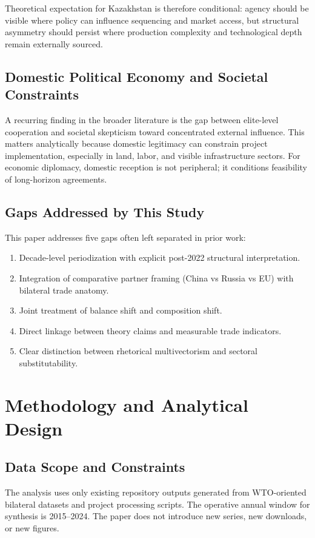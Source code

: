 \documentclass[12pt]{article}
\begin{document}
Theoretical expectation for Kazakhstan is therefore conditional: agency should be visible where policy can influence sequencing and market access, but structural asymmetry should persist where production complexity and technological depth remain externally sourced.

\subsection{Domestic Political Economy and Societal Constraints}
A recurring finding in the broader literature is the gap between elite-level cooperation and societal skepticism toward concentrated external influence. This matters analytically because domestic legitimacy can constrain project implementation, especially in land, labor, and visible infrastructure sectors. For economic diplomacy, domestic reception is not peripheral; it conditions feasibility of long-horizon agreements.

\subsection{Gaps Addressed by This Study}
This paper addresses five gaps often left separated in prior work:
\begin{enumerate}[leftmargin=*]
\item Decade-level periodization with explicit post-2022 structural interpretation.
\item Integration of comparative partner framing (China vs Russia vs EU) with bilateral trade anatomy.
\item Joint treatment of balance shift and composition shift.
\item Direct linkage between theory claims and measurable trade indicators.
\item Clear distinction between rhetorical multivectorism and sectoral substitutability.
\end{enumerate}

\section{Methodology and Analytical Design}
\subsection{Data Scope and Constraints}
The analysis uses only existing repository outputs generated from WTO-oriented bilateral datasets and project processing scripts. The operative annual window for synthesis is 2015--2024. The paper does not introduce new series, new downloads, or new figures.
\end{document}
